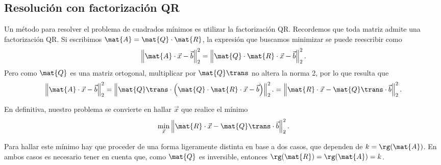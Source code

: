 \subsection{Resolución con factorización QR}
Un método para resolver el problema de cuadrados mínimos es utilizar la
factorización QR. Recordemos que toda matriz admite una factorización QR.
Si escribimos $\mat{A} = \mat{Q} \cdot \mat{R}$, la expresión que buscamos
minimizar se puede reescribir como
\[ \left\Vert \mat{A} \cdot \vec{x} - \vec{b} \right\Vert_2^2
    = \left\Vert \mat{Q} \cdot \mat{R} \cdot \vec{x} -
        \vec{b} \right\Vert_2^2. \]
Pero como $\mat{Q}$ es una matriz ortogonal,
multiplicar por $\mat{Q}\trans$ no altera la norma 2, por lo que resulta que
\[ \left\Vert \mat{A} \cdot \vec{x} - \vec{b} \right\Vert_2^2
    = \left\Vert \mat{Q}\trans \cdot \left( \mat{Q} \cdot \mat{R}
        \cdot \vec{x} - \vec{b} \right) \right\Vert_2^2.
    = \left\Vert \mat{R} \cdot \vec{x} - \mat{Q}\trans \cdot \vec{b}
        \right\Vert_2^2. \]

En definitiva, nuestro problema se convierte en hallar $\vec{x}$ que realice
el mínimo
\[ \min_{\vec{x}} \left\Vert \mat{R} \cdot \vec{x}
    - \mat{Q}\trans \cdot \vec{b} \right\Vert_2^2. \]

Para hallar este mínimo hay que proceder de una forma ligeramente distinta
en base a dos casos, que dependen de $k = \rg(\mat{A})$. En ambos casos
es necesario tener en cuenta que, como $\mat{Q}$ es inversible,
entonces $\rg(\mat{R}) = \rg(\mat{A}) = k$.

